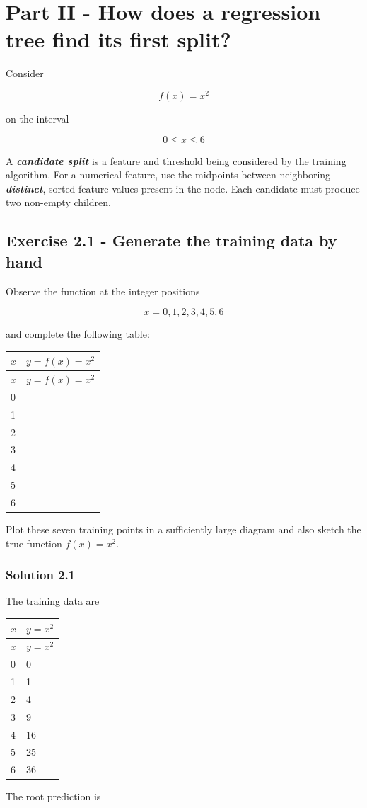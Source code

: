 \documentclass[10pt]{article}
\begin{document}
\clearpage
\section*{Part II - How does a regression tree find its first split?}
Consider

\[
f(x)=x^2
\]

on the interval

\[
0\leq x\leq 6
\]

A \textbf{\textit{candidate split}} is a feature and threshold being considered by the training algorithm. For a numerical feature, use the midpoints between neighboring \textbf{\textit{distinct}}, sorted feature values present in the node. Each candidate must produce two non-empty children.

\subsection*{Exercise 2.1 - Generate the training data by hand}
Observe the function at the integer positions

\[
x=0,1,2,3,4,5,6
\]

and complete the following table:

\begingroup
\small
\setlength{\tabcolsep}{4pt}
\begin{longtable}{l|l}
$x$ & $y=f(x)=x^2$ \\
\hline
\endfirsthead
$x$ & $y=f(x)=x^2$ \\
\hline
\endhead
0 &  \\[3pt]
1 &  \\[3pt]
2 &  \\[3pt]
3 &  \\[3pt]
4 &  \\[3pt]
5 &  \\[3pt]
6 &  \\[3pt]
\end{longtable}
\endgroup
Plot these seven training points in a sufficiently large diagram and also sketch the true function $f(x)=x^2$.

\begingroup\color{red}

\subsubsection*{Solution 2.1}
The training data are

\begingroup
\small
\setlength{\tabcolsep}{4pt}
\begin{longtable}{l|l}
$x$ & $y=x^2$ \\
\hline
\endfirsthead
$x$ & $y=x^2$ \\
\hline
\endhead
0 & 0 \\[1.5pt]
1 & 1 \\[1.5pt]
2 & 4 \\[1.5pt]
3 & 9 \\[1.5pt]
4 & 16 \\[1.5pt]
5 & 25 \\[1.5pt]
6 & 36 \\[1.5pt]
\end{longtable}
\endgroup
The root prediction is
\end{document}
